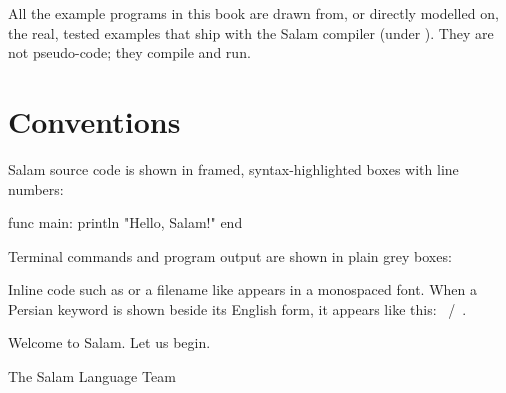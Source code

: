 \begin{note}
All the example programs in this book are drawn from, or directly modelled on,
the real, tested examples that ship with the Salam compiler (under
). They are not pseudo-code; they compile and run.
\end{note}

\section*{Conventions}

Salam source code is shown in framed, syntax-highlighted boxes with line
numbers:

\begin{salamen}
func main:
    println "Hello, Salam!"
end
\end{salamen}

\noindent Terminal commands and program output are shown in plain grey boxes:


\noindent Inline code such as  or a filename like
 appears in a monospaced font. When a Persian keyword is shown
beside its English form, it appears like this: ~/~.

\bigskip
\noindent Welcome to Salam. Let us begin.

\vspace{1em}
\hfill The Salam Language Team
\clearpage
